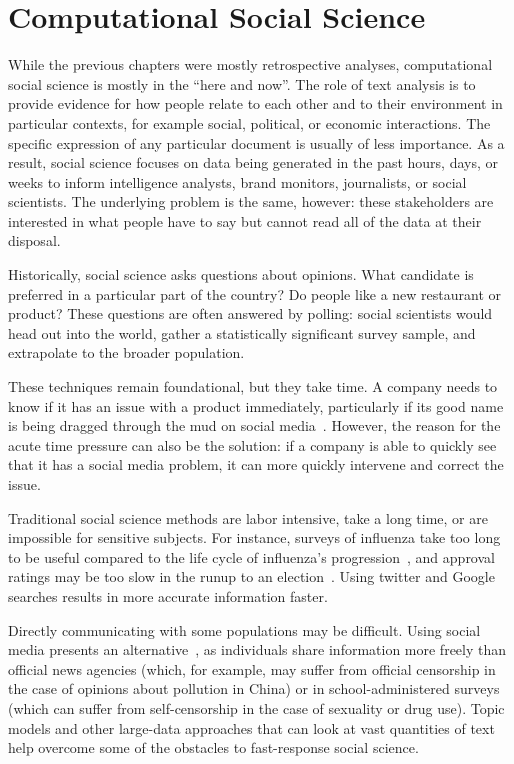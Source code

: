 
\chapter{Computational Social Science}
\label{ch:css}

While the previous chapters were mostly retrospective analyses, computational
social science is mostly in the ``here and now''.  
The role of text analysis is to provide evidence for how people relate to each other and to their environment in particular contexts, for example social, political, or economic interactions.
The specific expression of any particular document is usually of less importance.
As a result, social science focuses on data
being generated in the past hours, days, or weeks to inform
intelligence analysts, brand monitors, journalists, or social
scientists.  The underlying problem is the same, however: these
stakeholders are interested in what people have to say but cannot read
all of the data at their disposal.

Historically, social science asks questions about opinions. What candidate is
preferred in a particular part of the country? Do people like a
new restaurant or product?  These questions are often answered by
polling: social scientists would head out into the world, gather a
statistically significant survey sample, and extrapolate to the
broader population.

These techniques remain foundational, but they take time.  A
company needs to know if it has an issue with a product immediately,
particularly if its good name is being dragged through the mud on
social media~\citep{bowen-16}.  However, the reason for the acute time
pressure can also be the solution: if a company is able to quickly see
that it has a social media problem, it can more quickly intervene and
correct the issue.

Traditional social science methods are labor intensive, take a long
time, or are impossible for sensitive subjects.  For instance, surveys
of influenza take too long to be useful compared to the life cycle of
influenza's progression~\citep{broniatowsky-15}, and approval ratings
may be too slow in the runup to an election~\citep{oconnor-10}.  Using
twitter and Google searches results in more accurate information
faster.

Directly communicating with some
populations may be difficult.  Using social media presents an
alternative~\citep{wang:paul:dredze-15}, as individuals share
information more freely than official news agencies (which, for example, may suffer
from official censorship in the case of opinions about pollution in China) or in
school-administered surveys (which can suffer from self-censorship in
the case of sexuality or drug use).  Topic models and other large-data approaches
that can look at vast quantities of text help overcome some of the
obstacles to fast-response social science.

